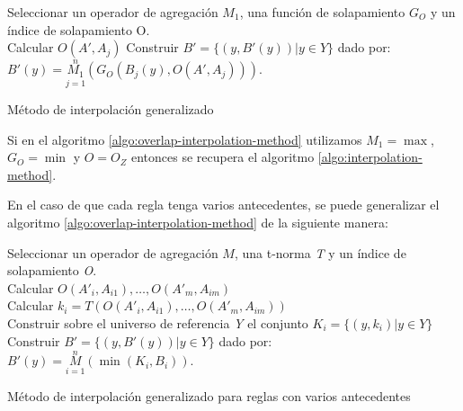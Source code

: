 \begin{algorithm}
\DontPrintSemicolon
{}
\vspace{0.4 cm}
Seleccionar un operador de agregación $M_{1}$, una función de solapamiento $G_{O}$ y un índice de solapamiento O.\\
 {
Calcular $O(A', A_{j})$
}
Construir $B' = \{(y, B'(y))|y \in Y\}$ dado por: \\
\centering
\nonl $B'(y) = \overset{n}{\underset{j=1}{M_{1}}}(G_{O}(B_{j}(y),O(A', A_{j})))$.\\
\;
\caption{Método de interpolación generalizado}
\label{algo:overlap-interpolation-method}
\end{algorithm}

Si en el algoritmo \ref{algo:overlap-interpolation-method} utilizamos $M_{1} = \max$, $G_{O} = \min$ y $O = O_{Z}$ entonces se recupera el algoritmo \ref{algo:interpolation-method}.

En el caso de que cada regla tenga varios antecedentes, se puede generalizar el algoritmo \ref{algo:overlap-interpolation-method} de la siguiente manera:

\begin{algorithm}
\DontPrintSemicolon
{}
\vspace{0.4 cm}
Seleccionar un operador de agregación $M$, una t-norma \emph{T} y un índice de solapamiento \emph{O}.\\
 {
Calcular $O(A'_{i}, A_{i1}),\ldots,O(A'_{m}, A_{im})$\\
Calcular $k_{i} = T(O(A'_{i}, A_{i1}),\ldots,O(A'_{m}, A_{im}))$\\
Construir sobre el universo de referencia \emph{Y} el conjunto $K_{i} = \{(y,k_{i})|y \in Y\}$
}
Construir $B' = \{(y, B'(y))|y \in Y\}$ dado por: \\
\centering
\nonl $B'(y) = \overset{n}{\underset{i=1}{M}}(\min(K_{i},B_{i}))$.\\
\;
\caption{Método de interpolación generalizado para reglas con varios antecedentes}
\label{algo:multi-overlap-interpolation-method}
\end{algorithm}

